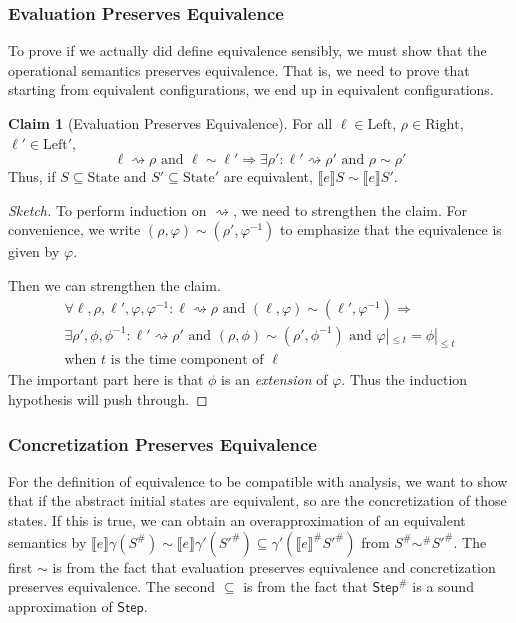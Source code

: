\documentclass{article}
\theoremstyle{definition}
\newtheorem{clm}{Claim}[section]
\newcommand*{\Abs}[1]{{#1}^{\#}}
\newcommand*{\Left}{\text{Left}}
\newcommand*{\Right}{\text{Right}}
\newcommand*{\State}{\text{State}}
\newcommand*{\Step}{\mathsf{Step}}
\newcommand*{\semarrow}{\rightsquigarrow}
\newcommand*{\equivalent}{\sim}
\newcommand*{\sembracket}[1]{\lBrack{#1}\rBrack}
\begin{document}
\subsubsection{Evaluation Preserves Equivalence}
To prove if we actually did define equivalence sensibly, we must show that the operational semantics preserves equivalence.
That is, we need to prove that starting from equivalent configurations, we end up in equivalent configurations.
\begin{clm}[Evaluation Preserves Equivalence]
  For all $\ell\in\Left$, $\rho\in\Right$, $\ell'\in\Left'$,
  \[\ell\semarrow\rho\text{ and }\ell\equivalent\ell'\Rightarrow\exists\rho':\ell'\semarrow\rho'\text{ and }\rho\equivalent\rho'\]
  Thus, if $S\subseteq\State$ and $S'\subseteq\State'$ are equivalent, $\sembracket{e}S\equivalent\sembracket{e}S'$.
\end{clm}
\begin{proof}[Sketch]
  To perform induction on $\semarrow$, we need to strengthen the claim.
  For convenience, we write $(\rho,\varphi)\equivalent(\rho',\varphi^{-1})$ to emphasize that the equivalence is given by $\varphi$.

  Then we can strengthen the claim.
  \[
    \begin{array}{l}
      \forall\ell,\rho,\ell',\varphi,\varphi^{-1}:\ell\semarrow\rho\text{ and }(\ell,\varphi)\equivalent(\ell',\varphi^{-1})\Rightarrow              \\
      \exists\rho',\phi,\phi^{-1}:\ell'\semarrow\rho'\text{ and }(\rho,\phi)\equivalent(\rho',\phi^{-1})\text{ and }\varphi|_{\le t}=\phi|_{\le t} \\
      \text{when }t\text{ is the time component of }\ell
    \end{array}
  \]
  The important part here is that $\phi$ is an \emph{extension} of $\varphi$.
  Thus the induction hypothesis will push through.
\end{proof}

\subsubsection{Concretization Preserves Equivalence}
For the definition of equivalence to be compatible with analysis, we want to show that if the abstract initial states are equivalent, so are the concretization of those states.
If this is true, we can obtain an overapproximation of an equivalent semantics by $\sembracket{e}\gamma(\Abs{S})\equivalent\sembracket{e}\gamma'(\Abs{S'})\subseteq\gamma'(\Abs{\sembracket{e}}\Abs{S'})$ from $\Abs{S}\Abs\equivalent\Abs{S'}$.
The first $\equivalent$ is from the fact that evaluation preserves equivalence and concretization preserves equivalence.
The second $\subseteq$ is from the fact that $\Abs\Step$ is a sound approximation of $\Step$.
\end{document}
